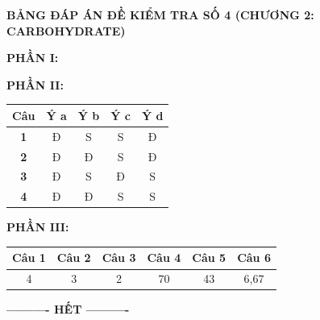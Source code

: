 \documentclass[12pt,a4paper]{article}
\begin{document}
\newpage
\noindent
{\color{hfRed}\textbf{\Large BẢNG ĐÁP ÁN ĐỀ KIỂM TRA SỐ 4 (CHƯƠNG 2: CARBOHYDRATE)}}

\vspace{0.3cm}
\noindent\textbf{PHẦN I:}
\begin{center}

\end{center}

\vspace{0.2cm}
\noindent\textbf{PHẦN II:}
\begin{center}
\begin{tabular}{|c|c|c|c|c|}
\hline
\textbf{Câu} & \textbf{Ý a} & \textbf{Ý b} & \textbf{Ý c} & \textbf{Ý d} \\ \hline
\textbf{1} & Đ & S & S & Đ \\ \hline
\textbf{2} & Đ & Đ & S & Đ \\ \hline
\textbf{3} & Đ & S & Đ & S \\ \hline
\textbf{4} & Đ & Đ & S & S \\ \hline
\end{tabular}
\end{center}

\vspace{0.2cm}
\noindent\textbf{PHẦN III:}
\begin{center}
\begin{tabular}{|c|c|c|c|c|c|}
\hline
\textbf{Câu 1} & \textbf{Câu 2} & \textbf{Câu 3} & \textbf{Câu 4} & \textbf{Câu 5} & \textbf{Câu 6} \\ \hline
4 & 3 & 2 & 70 & 43 & 6,67 \\ \hline
\end{tabular}
\end{center}

\begin{center}
	\textbf{---------- HẾT ----------}
\end{center}
\end{document}
